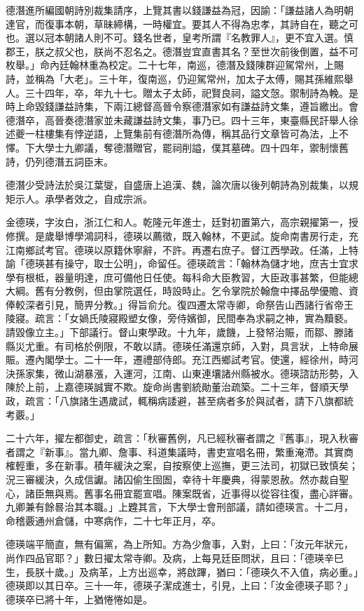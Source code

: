 \begin{pinyinscope}
德潛進所編國朝詩別裁集請序，上覽其書以錢謙益為冠，因諭：「謙益諸人為明朝達官，而復事本朝，草昧締構，一時權宜。要其人不得為忠孝，其詩自在，聽之可也。選以冠本朝諸人則不可。錢名世者，皇考所謂『名教罪人』，更不宜入選。慎郡王，朕之叔父也，朕尚不忍名之。德潛豈宜直書其名？至世次前後倒置，益不可枚舉。」命內廷翰林重為校定。二十七年，南巡，德潛及錢陳群迎駕常州，上賜詩，並稱為「大老」。三十年，復南巡，仍迎駕常州，加太子太傅，賜其孫維熙舉人。三十四年，卒，年九十七。贈太子太師，祀賢良祠，謚文愨。禦制詩為輓。是時上命毀錢謙益詩集，下兩江總督高晉令察德潛家如有謙益詩文集，遵旨繳出。會德潛卒，高晉奏德潛家並未藏謙益詩文集，事乃已。四十三年，東臺縣民訐舉人徐述夔一柱樓集有悖逆語，上覽集前有德潛所為傳，稱其品行文章皆可為法，上不懌。下大學士九卿議，奪德潛贈官，罷祠削謚，僕其墓碑。四十四年，禦制懷舊詩，仍列德潛五詞臣末。

德潛少受詩法於吳江葉燮，自盛唐上追漢、魏，論次唐以後列朝詩為別裁集，以規矩示人。承學者效之，自成宗派。

金德瑛，字汝白，浙江仁和人。乾隆元年進士，廷對初置第六，高宗親擢第一，授修撰。是歲舉博學鴻詞科，德瑛以薦徵，既入翰林，不更試。旋命南書房行走，充江南鄉試考官。德瑛以原籍休寧辭，不許。再遷右庶子。督江西學政。任滿，上特諭「德瑛甚有操守，取士公明」，命留任。德瑛疏言：「翰林為儲才地，庶吉士宜求學有根柢，器量明達，庶可備他日任使。每科命大臣教習，大臣政事甚繁，但能總大綱。舊有分教例，但由掌院選任，時設時止。乞令掌院於翰詹中擇品學優贍、資俸較深者引見，簡畀分教。」得旨俞允。復四遷太常寺卿，命祭告山西諸行省帝王陵寢。疏言：「女媧氏陵寢殿塑女像，旁侍嬪御，民間奉為求嗣之神，實為黷褻。請毀像立主。」下部議行。督山東學政。十九年，歲饑，上發帑治賑，而鄒、滕諸縣災尤重。有司格於例限，不敢以請。德瑛任滿還京師，入對，具言狀，上特命展賑。遷內閣學士。二十一年，遷禮部侍郎。充江西鄉試考官。使還，經徐州，時河決孫家集，微山湖暴漲，入運河，江南、山東連壤諸州縣被水。德瑛諮訪形勢，入陳於上前，上嘉德瑛誠實不欺。旋命尚書劉統勛董治疏築。二十三年，督順天學政，疏言：「八旗諸生遇歲試，輒稱病諉避，甚至病者多於與試者，請下八旗都統考覈。」

二十六年，擢左都御史，疏言：「秋審舊例，凡已經秋審者謂之『舊事』，現入秋審者謂之『新事』。當九卿、詹事、科道集議時，書吏宣唱名冊，繁重淹滯。其實商榷輕重，多在新事。積年緩決之案，自按察使上巡撫，更三法司，初獄已致慎矣；況三審緩決，久成信讞。諸囚偷生囹圄，幸待十年慶典，得蒙恩赦。然亦裁自聖心，諸臣無與焉。舊事名冊宜罷宣唱。陳案既省，近事得以從容往復，盡心詳審。九卿兼有餘晷治其本職。」上韙其言，下大學士會刑部議，請如德瑛言。十二月，命稽覈通州倉儲，中寒病作，二十七年正月，卒。

德瑛端平簡直，無有偏黨，為上所知。方為少詹事，入對，上曰：「汝元年狀元，尚作四品官耶？」數日擢太常寺卿。及病，上每見廷臣問狀，且曰：「德瑛辛巳生，長朕十歲。」及病革，上方出巡幸，將啟蹕，猶曰：「德瑛久不入值，病必重。」德瑛即以其日卒。三十一年，德瑛子潔成進士，引見，上曰：「汝金德瑛子耶？」德瑛卒已將十年，上猶惓惓如是。


\end{pinyinscope}
